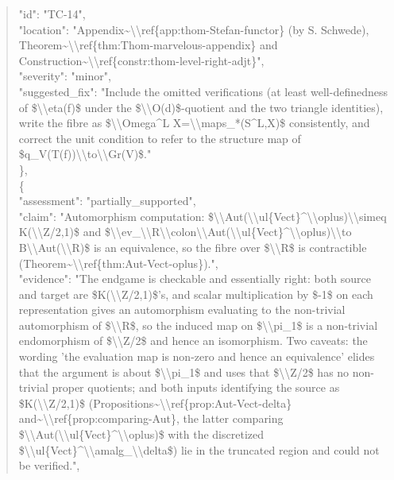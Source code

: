 \documentclass[11pt]{article}
\begin{document}
\begin{quote}
      "id": "TC-14",\\
      "location": "Appendix\~{}\textbackslash{}\textbackslash{}ref\{app:thom-Stefan-functor\} (by S. Schwede), Theorem\~{}\textbackslash{}\textbackslash{}ref\{thm:Thom-marvelous-appendix\} and Construction\~{}\textbackslash{}\textbackslash{}ref\{constr:thom-level-right-adjt\}",\\
      "severity": "minor",\\
      "suggested\_fix": "Include the omitted verifications (at least well-definedness of \$\textbackslash{}\textbackslash{}eta(f)\$ under the \$\textbackslash{}\textbackslash{}O(d)\$-quotient and the two triangle identities), write the fibre as \$\textbackslash{}\textbackslash{}Omega\^{}L X=\textbackslash{}\textbackslash{}maps\_*(S\^{}L,X)\$ consistently, and correct the unit condition to refer to the structure map of \$q\_V(T(f))\textbackslash{}\textbackslash{}to\textbackslash{}\textbackslash{}Gr(V)\$."\\
    \},\\
    \{\\
      "assessment": "partially\_supported",\\
      "claim": "Automorphism computation: \$\textbackslash{}\textbackslash{}Aut(\textbackslash{}\textbackslash{}ul\{Vect\}\^{}\textbackslash{}\textbackslash{}oplus)\textbackslash{}\textbackslash{}simeq K(\textbackslash{}\textbackslash{}Z/2,1)\$ and \$\textbackslash{}\textbackslash{}ev\_\textbackslash{}\textbackslash{}R\textbackslash{}\textbackslash{}colon\textbackslash{}\textbackslash{}Aut(\textbackslash{}\textbackslash{}ul\{Vect\}\^{}\textbackslash{}\textbackslash{}oplus)\textbackslash{}\textbackslash{}to B\textbackslash{}\textbackslash{}Aut(\textbackslash{}\textbackslash{}R)\$ is an equivalence, so the fibre over \$\textbackslash{}\textbackslash{}R\$ is contractible (Theorem\~{}\textbackslash{}\textbackslash{}ref\{thm:Aut-Vect-oplus\}).",\\
      "evidence": "The endgame is checkable and essentially right: both source and target are \$K(\textbackslash{}\textbackslash{}Z/2,1)\$'s, and scalar multiplication by \$-1\$ on each representation gives an automorphism evaluating to the non-trivial automorphism of \$\textbackslash{}\textbackslash{}R\$, so the induced map on \$\textbackslash{}\textbackslash{}pi\_1\$ is a non-trivial endomorphism of \$\textbackslash{}\textbackslash{}Z/2\$ and hence an isomorphism. Two caveats: the wording 'the evaluation map is non-zero and hence an equivalence' elides that the argument is about \$\textbackslash{}\textbackslash{}pi\_1\$ and uses that \$\textbackslash{}\textbackslash{}Z/2\$ has no non-trivial proper quotients; and both inputs identifying the source as \$K(\textbackslash{}\textbackslash{}Z/2,1)\$ (Propositions\~{}\textbackslash{}\textbackslash{}ref\{prop:Aut-Vect-delta\} and\~{}\textbackslash{}\textbackslash{}ref\{prop:comparing-Aut\}, the latter comparing \$\textbackslash{}\textbackslash{}Aut(\textbackslash{}\textbackslash{}ul\{Vect\}\^{}\textbackslash{}\textbackslash{}oplus)\$ with the discretized \$\textbackslash{}\textbackslash{}ul\{Vect\}\^{}\textbackslash{}\textbackslash{}amalg\_\textbackslash{}\textbackslash{}delta\$) lie in the truncated region and could not be verified.",\\

\end{quote}
\end{document}
